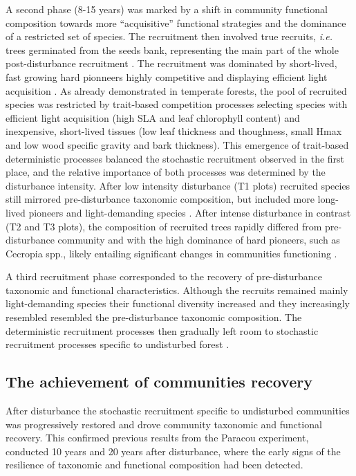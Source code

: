 \documentclass[fleqn,10pt]{ArtEcoFoG} %
\begin{document}
A second phase (8-15 years) was marked by a shift in community
functional composition towards more ``acquisitive'' functional
strategies and the dominance of a restricted set of species. The
recruitment then involved true recruits, \emph{i.e.} trees germinated
from the seeds bank, representing the main part of the whole
post-disturbance recruitment \citep{Lawton1988}. The recruitment was
dominated by short-lived, fast growing hard pionneers highly competitive
and displaying efficient light acquisition
\citep{Wright2004, Chave2009b, Herault2011}. As already demonstrated in
temperate forests, the pool of recruited species was restricted by
trait-based competition processes selecting species with efficient light
acquisition (high SLA and leaf chlorophyll content) and inexpensive,
short-lived tissues (low leaf thickness and thoughness, small Hmax and
low wood specific gravity and bark
thickness)\citep{Chave2004, Kunstler2016}. This emergence of trait-based
deterministic processes balanced the stochastic recruitment observed in
the first place, and the relative importance of both processes was
determined by the disturbance intensity. After low intensity disturbance
(T1 plots) recruited species still mirrored pre-disturbance taxonomic
composition, but included more long-lived pioneers and light-demanding
species \citep{Bongers2009}. After intense disturbance in contrast (T2
and T3 plots), the composition of recruited trees rapidly differed from
pre-disturbance community and with the high dominance of hard pioneers,
such as Cecropia spp., likely entailing significant changes in
communities functioning \citep{Diaz2005}.

A third recruitment phase corresponded to the recovery of
pre-disturbance taxonomic and functional characteristics. Although the
recruits remained mainly light-demanding species their functional
diversity increased and they increasingly resembled resembled the
pre-disturbance taxonomic composition. The deterministic recruitment
processes then gradually left room to stochastic recruitment processes
specific to undisturbed forest \citep{Lawton1988, Chave2004}.

\subsection{The achievement of communities
recovery}\label{the-achievement-of-communities-recovery}

After disturbance the stochastic recruitment specific to undisturbed
communities was progressively restored and drove community taxonomic and
functional recovery. This confirmed previous results from the Paracou
experiment, conducted 10 years \citep{Molino2001} and 20 years
\citep{Baraloto2012a} after disturbance, where the early signs of the
resilience of taxonomic and functional composition had been detected.
\end{document}
